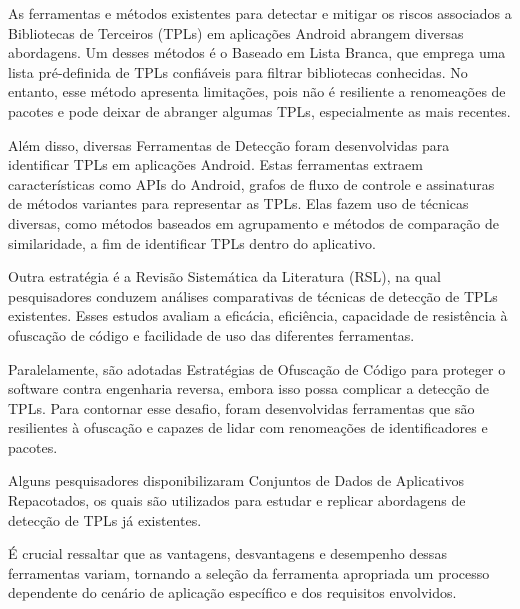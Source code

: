 

As ferramentas e métodos existentes para detectar e mitigar os riscos associados a Bibliotecas de Terceiros (TPLs) em aplicações Android abrangem diversas abordagens. Um desses métodos é o Baseado em Lista Branca, que emprega uma lista pré-definida de TPLs confiáveis para filtrar bibliotecas conhecidas. No entanto, esse método apresenta limitações, pois não é resiliente a renomeações de pacotes e pode deixar de abranger algumas TPLs, especialmente as mais recentes.

Além disso, diversas Ferramentas de Detecção foram desenvolvidas para identificar TPLs em aplicações Android. Estas ferramentas extraem características como APIs do Android, grafos de fluxo de controle e assinaturas de métodos variantes para representar as TPLs. Elas fazem uso de técnicas diversas, como métodos baseados em agrupamento e métodos de comparação de similaridade, a fim de identificar TPLs dentro do aplicativo.

Outra estratégia é a Revisão Sistemática da Literatura (RSL), na qual pesquisadores conduzem análises comparativas de técnicas de detecção de TPLs existentes. Esses estudos avaliam a eficácia, eficiência, capacidade de resistência à ofuscação de código e facilidade de uso das diferentes ferramentas.

Paralelamente, são adotadas Estratégias de Ofuscação de Código para proteger o software contra engenharia reversa, embora isso possa complicar a detecção de TPLs. Para contornar esse desafio, foram desenvolvidas ferramentas que são resilientes à ofuscação e capazes de lidar com renomeações de identificadores e pacotes.

Alguns pesquisadores disponibilizaram Conjuntos de Dados de Aplicativos Repacotados, os quais são utilizados para estudar e replicar abordagens de detecção de TPLs já existentes.

É crucial ressaltar que as vantagens, desvantagens e desempenho dessas ferramentas variam, tornando a seleção da ferramenta apropriada um processo dependente do cenário de aplicação específico e dos requisitos envolvidos.


